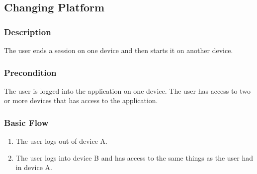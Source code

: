 \subsection{Changing Platform}
\subsubsection{Description}
The user ends a session on one device and then starts it on another device.

\subsubsection{Precondition}
The user is logged into the application on one device.
The user has access to two or more devices that has access to the application.

\subsubsection{Basic Flow}
\begin{enumerate}
\item The user logs out of device A.
\item The user logs into device B and has access to the same things as the user had in device A.
\end{enumerate}